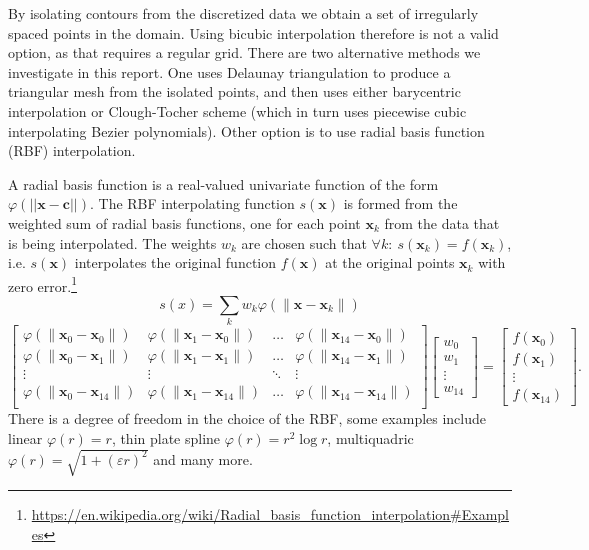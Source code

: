 \documentclass[a4paper,10pt]{report}
\begin{document}
By isolating contours from the discretized data we obtain a set of irregularly spaced points in the domain. Using bicubic interpolation therefore is not a valid option, as that requires a regular grid. There are two alternative methods we investigate in this report. One uses Delaunay triangulation to produce a triangular mesh from the isolated points, and then uses either barycentric interpolation or Clough-Tocher scheme (which in turn uses piecewise cubic interpolating Bezier polynomials). Other option is to use radial basis function (RBF) interpolation.

A radial basis function is a real-valued univariate function of the form $\varphi(||\mathbf{x}-\mathbf{c}||)$. The RBF interpolating function $s(\mathbf{x})$ is formed from the weighted sum of radial basis functions, one for each point $\mathbf{x}_k$ from the data that is being interpolated. The weights $w_k$ are chosen such that $\forall k:\ s(\mathbf{x}_k)=f(\mathbf{x}_k)$, i.e. $s(\mathbf{x})$ interpolates the original function $f(\mathbf{x})$ at the original points $\mathbf{x}_k$ with zero error.\footnote{\url{https://en.wikipedia.org/wiki/Radial\_basis\_function\_interpolation\#Examples}}
$$
s(x) = \sum\limits_{k} w_k \varphi(\|\mathbf{x}-\mathbf{x}_k\|)
$$
\begin{equation*}
 \begin{bmatrix}
\varphi(\|\mathbf{x}_0 - \mathbf{x}_0\|) & \varphi(\|\mathbf{x}_1 - \mathbf{x}_0\|) & \dots & \varphi(\|\mathbf{x}_{14} - \mathbf{x}_0\|) \\
\varphi(\|\mathbf{x}_0 - \mathbf{x}_1\|) & \varphi(\|\mathbf{x}_1 - \mathbf{x}_1\|) & \dots & \varphi(\|\mathbf{x}_{14} - \mathbf{x}_{1}\|) \\
\vdots & \vdots & \ddots & \vdots \\
\varphi(\|\mathbf{x}_0 - \mathbf{x}_{14}\|) & \varphi(\|\mathbf{x}_1 - \mathbf{x}_{14}\|) & \dots & \varphi(\|\mathbf{x}_{14} - \mathbf{x}_{14}\|) \\
\end{bmatrix}
\begin{bmatrix}w_0 \\ w_1 \\ \vdots \\ w_{14}\end{bmatrix}
= \begin{bmatrix}f(\mathbf{x}_0) \\ f(\mathbf{x}_1) \\ \vdots \\ f(\mathbf{x}_{14})\end{bmatrix}.
\end{equation*}
There is a degree of freedom in the choice of the RBF, some examples include linear $\varphi(r) = r$, thin plate spline $\varphi(r) = r^2\log{r}$, multiquadric $\varphi(r) = \sqrt{1+(\varepsilon r)^2}$ and many more.
\end{document}
